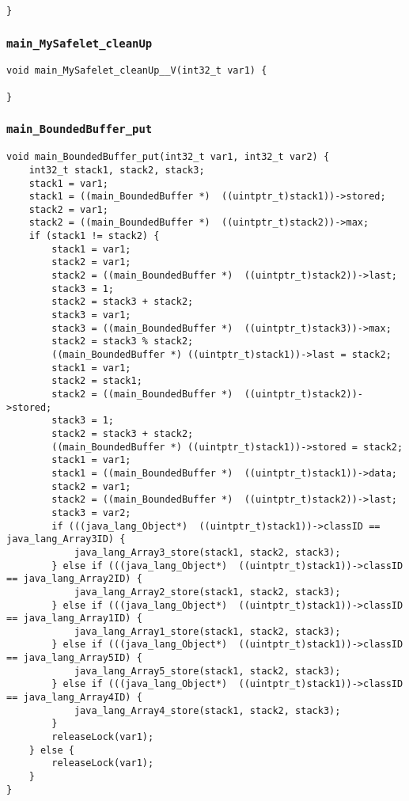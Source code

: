 \begin{landscape}
\begin{multicols}{2}
\begin{lstlisting}[firstnumber=603]
}
\end{lstlisting}

\subsubsection{\texttt{main\_MySafelet\_cleanUp}}

\begin{lstlisting}[firstnumber=749]
void main_MySafelet_cleanUp__V(int32_t var1) {
	
}
\end{lstlisting}

\subsubsection{\texttt{main\_BoundedBuffer\_put}}

\begin{lstlisting}[firstnumber=888]
void main_BoundedBuffer_put(int32_t var1, int32_t var2) {
	int32_t stack1, stack2, stack3;
	stack1 = var1;
	stack1 = ((main_BoundedBuffer *)  ((uintptr_t)stack1))->stored;
	stack2 = var1;
	stack2 = ((main_BoundedBuffer *)  ((uintptr_t)stack2))->max;
	if (stack1 != stack2) {
		stack1 = var1;
		stack2 = var1;
		stack2 = ((main_BoundedBuffer *)  ((uintptr_t)stack2))->last;
		stack3 = 1;
		stack2 = stack3 + stack2;
		stack3 = var1;
		stack3 = ((main_BoundedBuffer *)  ((uintptr_t)stack3))->max;
		stack2 = stack3 % stack2;
		((main_BoundedBuffer *) ((uintptr_t)stack1))->last = stack2;
		stack1 = var1;
		stack2 = stack1;
		stack2 = ((main_BoundedBuffer *)  ((uintptr_t)stack2))->stored;
		stack3 = 1;
		stack2 = stack3 + stack2;
		((main_BoundedBuffer *) ((uintptr_t)stack1))->stored = stack2;
		stack1 = var1;
		stack1 = ((main_BoundedBuffer *)  ((uintptr_t)stack1))->data;
		stack2 = var1;
		stack2 = ((main_BoundedBuffer *)  ((uintptr_t)stack2))->last;
		stack3 = var2;
		if (((java_lang_Object*)  ((uintptr_t)stack1))->classID == java_lang_Array3ID) {
			java_lang_Array3_store(stack1, stack2, stack3);
		} else if (((java_lang_Object*)  ((uintptr_t)stack1))->classID == java_lang_Array2ID) {
			java_lang_Array2_store(stack1, stack2, stack3);
		} else if (((java_lang_Object*)  ((uintptr_t)stack1))->classID == java_lang_Array1ID) {
			java_lang_Array1_store(stack1, stack2, stack3);
		} else if (((java_lang_Object*)  ((uintptr_t)stack1))->classID == java_lang_Array5ID) {
			java_lang_Array5_store(stack1, stack2, stack3);
		} else if (((java_lang_Object*)  ((uintptr_t)stack1))->classID == java_lang_Array4ID) {
			java_lang_Array4_store(stack1, stack2, stack3);
		}
		releaseLock(var1);
	} else {
		releaseLock(var1);
	}
}
\end{lstlisting}


\end{multicols}
\end{landscape}
